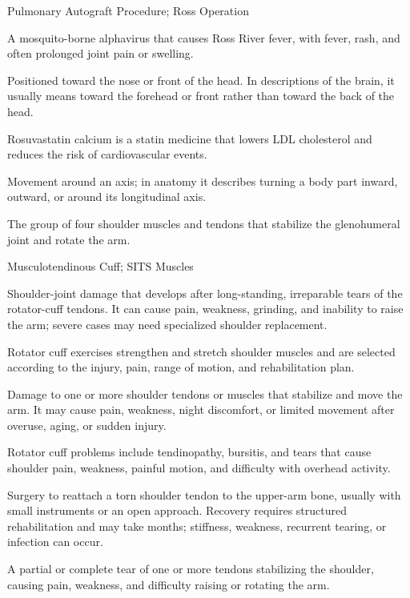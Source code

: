 \synonyms
Pulmonary Autograft Procedure; Ross Operation

 A mosquito-borne alphavirus that causes Ross River fever, with fever, rash, and often prolonged joint pain or swelling.

 Positioned toward the nose or front of the head. In descriptions of the brain, it usually means toward the forehead or front rather than toward the back of the head.

 Rosuvastatin calcium is a statin medicine that lowers LDL cholesterol and reduces the risk of cardiovascular events.

 Movement around an axis; in anatomy it describes turning a body part inward, outward, or around its longitudinal axis.

 The group of four shoulder muscles and tendons that stabilize the glenohumeral joint and rotate the arm.

\synonyms
Musculotendinous Cuff; SITS Muscles

 Shoulder-joint damage that develops after long-standing, irreparable tears of the rotator-cuff tendons. It can cause pain, weakness, grinding, and inability to raise the arm; severe cases may need specialized shoulder replacement.

 Rotator cuff exercises strengthen and stretch shoulder muscles and are selected according to the injury, pain, range of motion, and rehabilitation plan.

 Damage to one or more shoulder tendons or muscles that stabilize and move the arm. It may cause pain, weakness, night discomfort, or limited movement after overuse, aging, or sudden injury.

 Rotator cuff problems include tendinopathy, bursitis, and tears that cause shoulder pain, weakness, painful motion, and difficulty with overhead activity.

 Surgery to reattach a torn shoulder tendon to the upper-arm bone, usually with small instruments or an open approach. Recovery requires structured rehabilitation and may take months; stiffness, weakness, recurrent tearing, or infection can occur.

 A partial or complete tear of one or more tendons stabilizing the shoulder, causing pain, weakness, and difficulty raising or rotating the arm.

